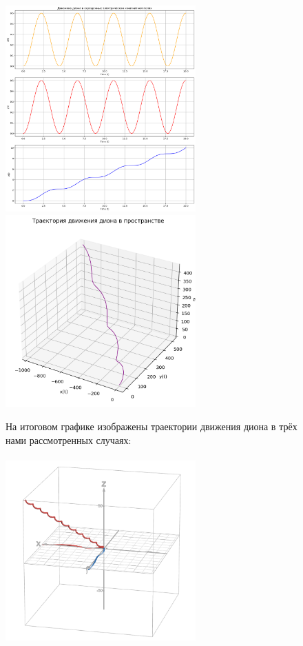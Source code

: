 \documentclass[oneside,final,14pt]{extarticle}
\begin{document}
	\begin{figure}
		\centering
		\includegraphics[width=0.65\textwidth]{dion_E_B.png}
		\label{fig:label_3}
		\includegraphics[width=0.65\textwidth]{dion_E_B_xyz.png}
		\label{fig:label_4}
	\end{figure}
	
	\begin{figure}
		\noindent На итоговом графике изображены траектории движения диона в трёх нами рассмотренных случаях: \\\\
		\centering
		\includegraphics[width=0.65\textwidth]{all_trajectories.png}
		\label{fig:label_5}
	\end{figure}
	
\end{document}
